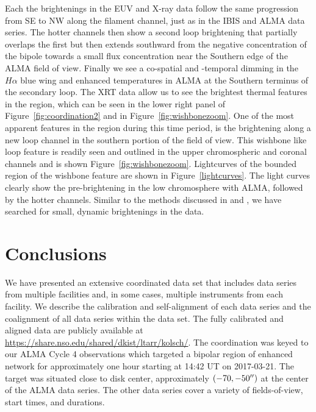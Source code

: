 \documentclass[twocolumn]{aastex62}
\newcommand{\halpha}{\ensuremath{H\alpha}}
\begin{document}
Each the brightenings in the EUV and X-ray data follow the same progression from SE to NW along the filament channel, just as in the IBIS and ALMA data series.
The hotter channels then show a second loop brightening that partially overlaps the first but then extends southward from the negative concentration of the bipole towards a small flux concentration near the Southern edge of the ALMA field of view.
Finally we see a co-spatial and -temporal dimming in the \halpha{} blue wing and enhanced temperatures in ALMA at the Southern terminus of the secondary loop. 
The XRT data allow us to see the brightest thermal features in the region, which can be seen in the lower right panel of Figure~\ref{fig:coordination2} and in Figure~\ref{fig:wishbonezoom}. 
One of the most apparent features in the region during this time period, is the brightening along a new loop channel in the southern portion of the field of view.
This wishbone like loop feature is readily seen and outlined in the upper chromospheric and coronal channels and is shown Figure~\ref{fig:wishbonezoom}.
Lightcurves of the bounded region of the wishbone feature are shown in Figure~\ref{lightcurves}. 
The light curves clearly show the pre-brightening in the low chromosphere with ALMA, followed by the hotter channels.
Similar to the methods discussed in \citet{2014KobelskiEA_XRTTBs} and \citet{2014KobelskiMcKenzie_HiC}, we have searched for small, dynamic brightenings in the data. 





\section{Conclusions}\label{sec:conclusion}
We have presented an extensive coordinated data set that includes data series from multiple facilities and, in some cases, multiple instruments from each facility.
We describe the calibration and self-alignment of each data series and the coalignment of all data series within the data set.
The fully calibrated and aligned data are publicly available at \url{https://share.nso.edu/shared/dkist/ltarr/kolsch/}.
The coordination was keyed to our ALMA Cycle 4 observations which targeted a bipolar region of enhanced network for approximately one hour starting at 14:42 UT on 2017-03-21.
The target was situated close to disk center, approximately $(-70,-50\mbox{$^{\prime\prime}$}{})$ at the center of the ALMA data series. 
The other data series cover a variety of fields-of-view, start times, and durations.
\end{document}
